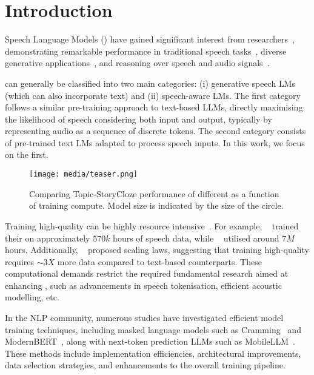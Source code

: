 \section{Introduction}

Speech Language Models (\slms) have gained significant interest from researchers~\cite{peng2024survey, cui2024recent, ji2024wavchat, latif2023sparks}, demonstrating remarkable performance in traditional speech tasks~\cite{valle, elmakies2025unsupervisedspeechsegmentationgeneral}, diverse generative applications~\cite{yang2023uniaudio, yang2024uniaudio}, and reasoning over speech and audio signals~\cite{salmonn, qwen_audio}.

\slms can generally be classified into two main categories: (i) generative speech \ac{LMs} (which can also incorporate text) and (ii) speech-aware \ac{LMs}. The first category follows a similar pre-training approach to text-based \ac{LLMs}, directly maximising the likelihood of speech considering both input and output, typically by representing audio as a sequence of discrete tokens. The second category consists of pre-trained text \ac{LMs} adapted to process speech inputs. In this work, we focus on the first.

\begin{figure}[t]
  \texttt{[image: media/teaser.png]}
  \caption{Comparing Topic-StoryCloze performance of different \slms as a function of training compute. Model size is indicated by the size of the circle.}
  \label{fig:teaser}
\end{figure}

Training high-quality \slms can be highly resource intensive~\cite{twist, cuervo2024scaling, scaling_interleaving, spiritlm, defossez2024moshi}. For example, ~\citet{spiritlm} trained their \slm on approximately $570k$ hours of speech data, while ~\citet{defossez2024moshi} utilised around $7M$ hours. Additionally, ~\citet{cuervo2024scaling} proposed \slm scaling laws, suggesting that training high-quality \slms requires $\sim3X$ more data compared to text-based counterparts. These computational demands restrict the required fundamental research aimed at enhancing \slms, such as advancements in speech tokenisation, efficient acoustic modelling, etc.


In the \ac{NLP} community, numerous studies have investigated efficient model training techniques, including masked language models such as Cramming~\citep{geiping2023cramming} and ModernBERT~\citep{warner2024modernbert}, along with next-token prediction LLMs such as MobileLLM~\citep{mobilellm}. These methods include implementation efficiencies, architectural improvements, data selection strategies, and enhancements to the overall training pipeline. 


